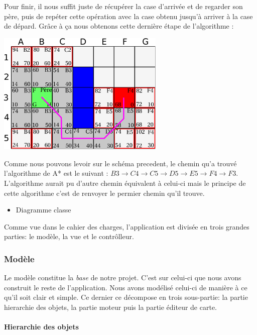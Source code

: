 			Pour finir, il nous suffit juste de récupérer la case d'arrivée et de regarder son père, puis de repéter cette opération avec la case obtenu jusqu'à arriver à la case de dépard. Grâce à ça nous obtenons cette dernière étape de l'algorithme :
			\begin{center}
				\includegraphics[width=8cm]{./Analyse/Img/Grille6.eps}
			\end{center}
		
			Comme nous pouvons levoir sur le schéma precedent, le chemin qu'a trouvé l'algorithme de A* est le suivant : $ B3 \rightarrow C4 \rightarrow C5 \rightarrow D5 \rightarrow E5 \rightarrow F4 \rightarrow F3 $. L'algorithme aurait pu d'autre chemin équivalent à celui-ci mais le principe de cette algorithme c'est de renvoyer le permier chemin qu'il trouve.
		
	\begin{itemize}
		\item{Diagramme classe}
	\end{itemize}
	
	Comme vue dans le cahier des charges, l'application est divisée en trois grandes parties: le modèle, la vue et le contrôlleur.
	
	\subsubsection{Modèle}
	
	Le modèle constitue la \textit{base} de notre projet. C'est sur celui-ci que nous avons construit le reste de l'application. Nous avons modélisé celui-ci de manière à ce qu'il soit clair et simple. Ce dernier ce décompose en trois sous-partie: la partie hierarchie des objets, la partie moteur puis la partie éditeur de carte.\\
	
	\paragraph{Hierarchie des objets \\}
	
